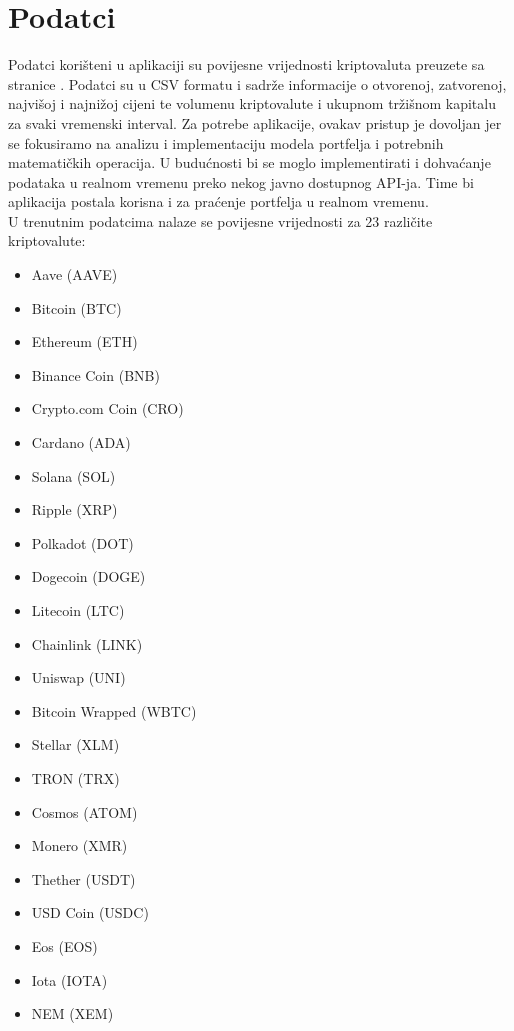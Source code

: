 \documentclass[zavrsnirad, upload]{fer}
\begin{document}
\section{Podatci}
\label{sek:podaci}
Podatci korišteni u aplikaciji su povijesne vrijednosti
kriptovaluta preuzete sa stranice \cite{kaggledataset}.
Podatci su u CSV formatu i sadrže informacije o otvorenoj, zatvorenoj,
najvišoj i najnižoj cijeni te volumenu kriptovalute i ukupnom tržišnom
kapitalu za svaki vremenski interval. Za potrebe aplikacije,
ovakav pristup je dovoljan jer se fokusiramo na analizu i
implementaciju modela portfelja i potrebnih matematičkih operacija.
U budućnosti bi se moglo implementirati i dohvaćanje podataka
u realnom vremenu preko nekog javno dostupnog API-ja. Time bi
aplikacija postala korisna i za praćenje portfelja u realnom vremenu.\\
U trenutnim podatcima nalaze se povijesne vrijednosti za 23 različite
kriptovalute:
\begin{itemize}
    \item Aave (AAVE)
    \item Bitcoin (BTC)
    \item Ethereum (ETH)
    \item Binance Coin (BNB)
    \item Crypto.com Coin (CRO)
    \item Cardano (ADA)
    \item Solana (SOL)
    \item Ripple (XRP)
    \item Polkadot (DOT)
    \item Dogecoin (DOGE)
    \item Litecoin (LTC)
    \item Chainlink (LINK)
    \item Uniswap (UNI)
    \item Bitcoin Wrapped (WBTC)
    \item Stellar (XLM)
    \item TRON (TRX)
    \item Cosmos (ATOM)
    \item Monero (XMR)
    \item Thether (USDT)
    \item USD Coin (USDC)
    \item Eos (EOS)
    \item Iota (IOTA)
    \item NEM (XEM)
\end{itemize}


\end{document}
